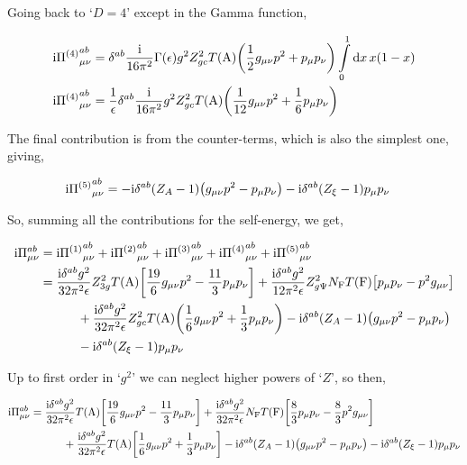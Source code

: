 Going back to `$D=4$' except in the Gamma function,

\begin{align}
    \textnormal{i} {\Pi^{\qty(4)}}^{ab}_{\mu\nu}&=\delta^{ab}\frac{\textnormal{i}}{16\pi^2}\Gamma\qty(\epsilon)g^2Z_{gc}^2T\qty(\textnormal{A})\qty(\frac12g_{\mu\nu}p^2+p_\mu p_\nu)\int\limits_0^1\dd{x}x\qty(1-x)\nonumber\\
    \textnormal{i} {\Pi^{\qty(4)}}^{ab}_{\mu\nu}&=\frac1\epsilon\delta^{ab}\frac{\textnormal{i}}{16\pi^2}g^2Z_{gc}^2T\qty(\textnormal{A})\qty(\frac{1}{12}g_{\mu\nu}p^2+\frac16p_\mu p_\nu)\nonumber
\end{align}

The final contribution is from the counter-terms, which is also the simplest one, giving,

\begin{align}
    \textnormal{i} {\Pi^{\qty(5)}}^{ab}_{\mu\nu}&=-\textnormal{i}\delta^{ab}\qty(Z_A-1)\qty(g_{\mu\nu}p^2-p_\mu p_\nu)-\textnormal{i}\delta^{ab}\qty(Z_\xi-1)p_\mu p_\nu\nonumber
\end{align}

So, summing all the contributions for the self-energy, we get,

\begin{align}
    \textnormal{i} \Pi^{ab}_{\mu\nu}&=\textnormal{i} {\Pi^{\qty(1)}}^{ab}_{\mu\nu}+\textnormal{i} {\Pi^{\qty(2)}}^{ab}_{\mu\nu}+\textnormal{i} {\Pi^{\qty(3)}}^{ab}_{\mu\nu}+\textnormal{i} {\Pi^{\qty(4)}}^{ab}_{\mu\nu}+\textnormal{i} {\Pi^{\qty(5)}}^{ab}_{\mu\nu}\nonumber\\
    &=\frac{\textnormal{i}\delta^{ab}g^2}{32\pi^2\epsilon}Z_{3g}^2T\qty(\textnormal{A})\qty[\frac{19}{6}g_{\mu\nu}p^2-\frac{11}{3}p_\mu p_\nu]+\frac{\textnormal{i}\delta^{ab}g^2}{12\pi^2\epsilon}Z_{g\Psi}^2N_{\textnormal{F}}T\qty(\textnormal{F})\qty[p_\mu p_\nu-p^2g_{\mu\nu}]\nonumber\\
    &\quad\quad\quad+\frac{\textnormal{i}\delta^{ab}g^2}{32\pi^2\epsilon}Z_{gc}^2T\qty(\textnormal{A})\qty(\frac{1}{6}g_{\mu\nu}p^2+\frac13p_\mu p_\nu)-\textnormal{i}\delta^{ab}\qty(Z_A-1)\qty(g_{\mu\nu}p^2-p_\mu p_\nu)\nonumber\\
    &\quad\quad\quad-\textnormal{i}\delta^{ab}\qty(Z_\xi-1)p_\mu p_\nu\nonumber
\end{align}

Up to first order in `$g^2$' we can neglect higher powers of `$Z$', so then,

\begin{align}
    \textnormal{i} \Pi^{ab}_{\mu\nu}&=\frac{\textnormal{i}\delta^{ab}g^2}{32\pi^2\epsilon}T\qty(\textnormal{A})\qty[\frac{19}{6}g_{\mu\nu}p^2-\frac{11}{3}p_\mu p_\nu]+\frac{\textnormal{i}\delta^{ab}g^2}{32\pi^2\epsilon}N_{\textnormal{F}}T\qty(\textnormal{F})\qty[\frac83p_\mu p_\nu-\frac83p^2g_{\mu\nu}]\nonumber\\
    &\quad\quad\quad+\frac{\textnormal{i}\delta^{ab}g^2}{32\pi^2\epsilon}T\qty(\textnormal{A})\qty[\frac{1}{6}g_{\mu\nu}p^2+\frac13p_\mu p_\nu]-\textnormal{i}\delta^{ab}\qty(Z_A-1)\qty(g_{\mu\nu}p^2-p_\mu p_\nu)-\textnormal{i}\delta^{ab}\qty(Z_\xi-1)p_\mu p_\nu\nonumber
\end{align}


